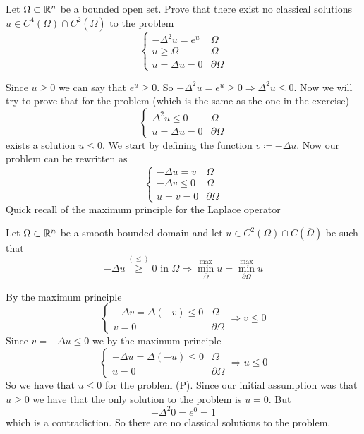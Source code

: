 \newpage
\begin{exercise}
    Let \(\Omega \subset \mathbb{R}^n\) be a bounded open set. Prove that there exist no classical solutions \(u \in C^4(\Omega) \cap C^2(\overline{\Omega})\) to the problem
    \[
        \begin{cases}
            -\Delta^2 u = e^u & \Omega \\
            u \geq \Omega & \Omega \\
            u = \Delta u = 0 & \partial\Omega
        \end{cases}
    \]
\end{exercise}
Since \(u \geq 0\) we can say that \(e^u \geq 0\). So \(- \Delta^2 u = e^u \geq 0 \Rightarrow \Delta^2 u \leq 0\). Now we will try to prove that for the problem (which is the same as the one in the exercise) 
\[
    \begin{cases}
        \Delta^2 u \leq 0 & \Omega \\
        u = \Delta u = 0 & \partial\Omega
    \end{cases}
    \tag*{(P)}
\]
exists a solution \(u \leq 0\). We start by defining the function \(v \coloneqq -\Delta u\). 
Now our problem can be rewritten as
\[
    \begin{cases}
        -\Delta u = v & \Omega \\
        -\Delta v \leq 0 & \Omega \\
        u = v = 0 & \partial\Omega
    \end{cases}
\]
Quick recall of the maximum principle for the Laplace operator
\begin{remark}
    Let \(\Omega \subset \mathbb{R}^n\) be a smooth bounded domain and let \(u \in C^2(\Omega) \cap C(\overline{\Omega})\) be such that \[-\Delta u \overset{(\leq)}{\geq} 0 \text{ in } \Omega \Rightarrow \overset{\max}{\min_{\overline{\Omega}}} u = \overset{\max}{\min_{\partial\Omega}} u\]
\end{remark}
By the maximum principle 
\[
    \begin{cases}
        -\Delta v = \Delta (- v) \leq 0 & \Omega \\
        v = 0 & \partial\Omega
    \end{cases}
    \Rightarrow v \leq 0
\]
Since \(v = -\Delta u \leq 0\) we by the maximum principle
\[
    \begin{cases}
        -\Delta u = \Delta(-u) \leq 0 & \Omega \\
        u = 0 & \partial\Omega
    \end{cases}
    \Rightarrow u \leq 0
\]
So we have that \(u \leq 0\) for the problem (P). Since our initial assumption was that \(u \geq 0\) we have that the only solution to the problem is \(u = 0\). But 
\[
        -\Delta^2 0 = e^0 = 1 
\]
which is a contradiction. So there are no classical solutions to the problem.

